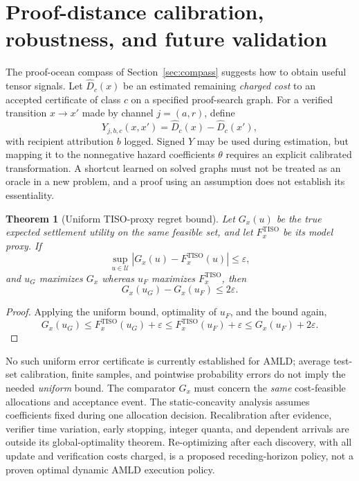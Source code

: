 \documentclass[11pt]{article}
\newtheorem{theorem}[definition]{Theorem}
\newcommand{\Uset}{\mathcal U}
\begin{document}
\section{Proof-distance calibration, robustness, and future validation}\label{sec:calibration}
The proof-ocean compass of Section~\ref{sec:compass} suggests how to obtain useful tensor signals. Let $\widehat D_c(x)$ be an estimated remaining \emph{charged cost} to an accepted certificate of class $c$ on a specified proof-search graph. For a verified transition $x\to x'$ made by channel $j=(a,r)$, define
\[
Y_{j,b,c}(x,x')=\widehat D_c(x)-\widehat D_c(x'),
\]
with recipient attribution $b$ logged. Signed $Y$ may be used during estimation, but mapping it to the nonnegative hazard coefficients $\theta$ requires an explicit calibrated transformation. A shortcut learned on solved graphs must not be treated as an oracle in a new problem, and a proof using an assumption does not establish its essentiality.

\begin{theorem}[Uniform TISO-proxy regret bound]\label{thm:proxy}
Let $G_x(u)$ be the true expected settlement utility on the same feasible set, and let $F_x^{\mathrm{TISO}}$ be its model proxy. If
\[
\sup_{u\in\Uset}\left|G_x(u)-F_x^{\mathrm{TISO}}(u)\right|\le\varepsilon,
\]
and $u_G$ maximizes $G_x$ whereas $u_F$ maximizes $F_x^{\mathrm{TISO}}$, then
\[
\boxed{G_x(u_G)-G_x(u_F)\le2\varepsilon.}
\]
\end{theorem}
\begin{proof}
Applying the uniform bound, optimality of $u_F$, and the bound again,
\[
G_x(u_G)\le F_x^{\mathrm{TISO}}(u_G)+\varepsilon
\le F_x^{\mathrm{TISO}}(u_F)+\varepsilon
\le G_x(u_F)+2\varepsilon.
\]
\end{proof}
No such uniform error certificate is currently established for AMLD; average test-set calibration, finite samples, and pointwise probability errors do not imply the needed \emph{uniform} bound. The comparator $G_x$ must concern the \emph{same} cost-feasible allocations and acceptance event. The static-concavity analysis assumes coefficients fixed during one allocation decision. Recalibration after evidence, verifier time variation, early stopping, integer quanta, and dependent arrivals are outside its global-optimality theorem. Re-optimizing after each discovery, with all update and verification costs charged, is a proposed receding-horizon policy, not a proven optimal dynamic AMLD execution policy.
\end{document}
